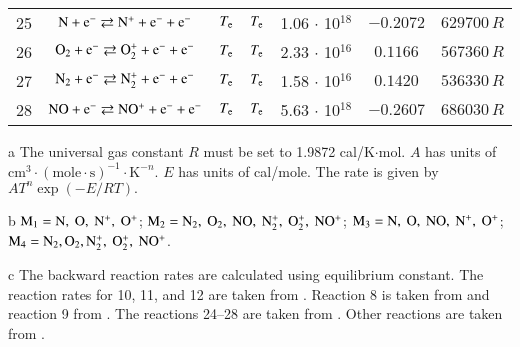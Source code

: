 \documentclass{warpdoc}
\begin{document}
\begin{table}[t]
\begin{center}
\begin{threeparttable}
\begin{tabular}{ccccccc}
25 & $\rm N + e^- \rightleftarrows N^+ + e^- + e^- $ & $T_{\rm e}$ & $T_{\rm e}$ & 1.06 $\cdot$ 10$^{18}$  & $-0.2072$ & $629700 \, R$ \\

26 & $\rm O_2 + e^- \rightleftarrows O_2^+ + e^- + e^-$ &$T_{\rm e}$ &$T_{\rm e}$ & 2.33 $\cdot$ 10$^{16}$ & $0.1166$ & $567360\, R$ \\

27 & $\rm N_2 + e^- \rightleftarrows N_2^+ + e^- + e^-$ &$T_{\rm e}$ &$T_{\rm e}$ & 1.58 $\cdot$ 10$^{16}$ & $0.1420$ & $536330\, R$ \\

28 & $\rm NO + e^- \rightleftarrows NO^+ + e^- + e^-$ &$T_{\rm e}$ &$T_{\rm e}$ & 5.63 $\cdot$ 10$^{18}$ & $-0.2607$ & $686030\, R$ \\

\bottomrule
\end{tabular}
\begin{tablenotes}
\item[{a}] The universal gas constant $R$ must be set to 1.9872	cal/K$\cdot$mol. $A$ has units of $\textrm{cm}^3\cdot(\textrm{mole}\cdot \textrm{s})^{-1}\cdot \textrm{K}^{-n}$. $E$ has units of cal/mole. The rate is given by $A T^n \exp(-E/RT).$
\item[{b}] $\rm M_1=N,~O,~N^+,~O^+$; $\rm M_2=N_2,~O_2,~NO,~N_2^+,~O_2^+,~NO^+$; $\rm M_3= N,~O,~NO,~N^+,~O^+$; $\rm M_4=N_2,O_2,N_2^+,~O_2^+,~NO^+$.
\item[{c}] The backward reaction rates are calculated using equilibrium constant. The reaction rates for 10, 11, and 12 are taken from \cite{pf:2007:boyd}. Reaction 8 is taken from \cite{jcp:1997:bose} and reaction 9 from \cite{jcp:1996:bose}. The reactions 24--28 are taken from \cite{pof:2022:parent}.  Other reactions are taken from \cite{book:1990:park}.
\end{tablenotes}
\label{tab:parent2023}
\end{threeparttable}
\end{center}
\end{table}
%
\end{document}

